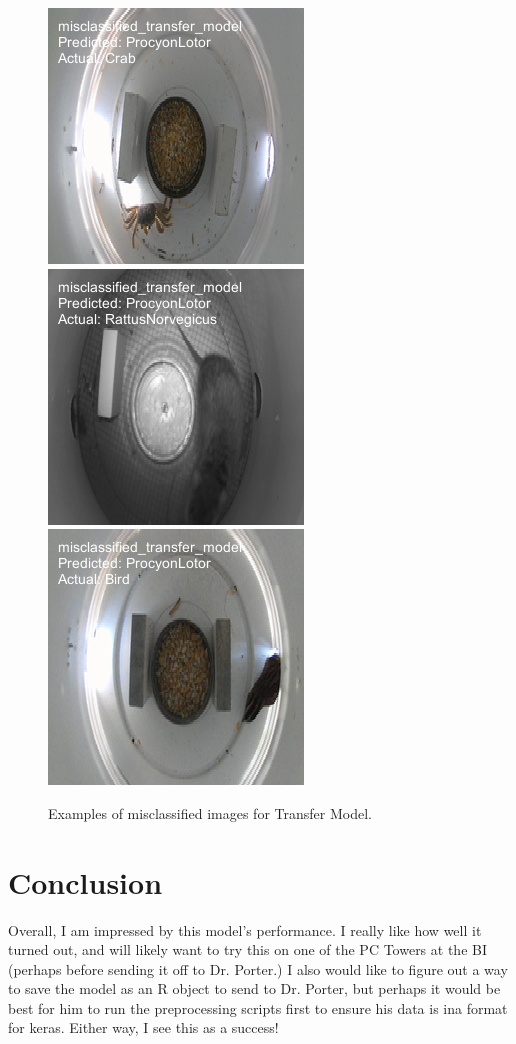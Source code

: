 \documentclass[a4paper,12pt]{article}
\begin{document}
\begin{figure}[H]
    \centering
    \includegraphics[width=0.3\linewidth]{results/misclassified_transfer_model_image_33.png}
    \includegraphics[width=0.3\linewidth]{results/misclassified_transfer_model_image_26.png}
    \includegraphics[width=0.3\linewidth]{results/misclassified_transfer_model_image_82.png}
    \caption{Examples of misclassified images for Transfer Model.}
\end{figure}


\section{Conclusion}
Overall, I am impressed by this model's performance. I really like how well it turned out, and will likely want to try this on one of the PC Towers at the BI (perhaps before sending it off to Dr. Porter.) I also would like to figure out a way to save the model as an R object to send to Dr. Porter, but perhaps it would be best for him to run the preprocessing scripts first to ensure his data is ina format for keras. Either way, I see this as a success!
\end{document}
